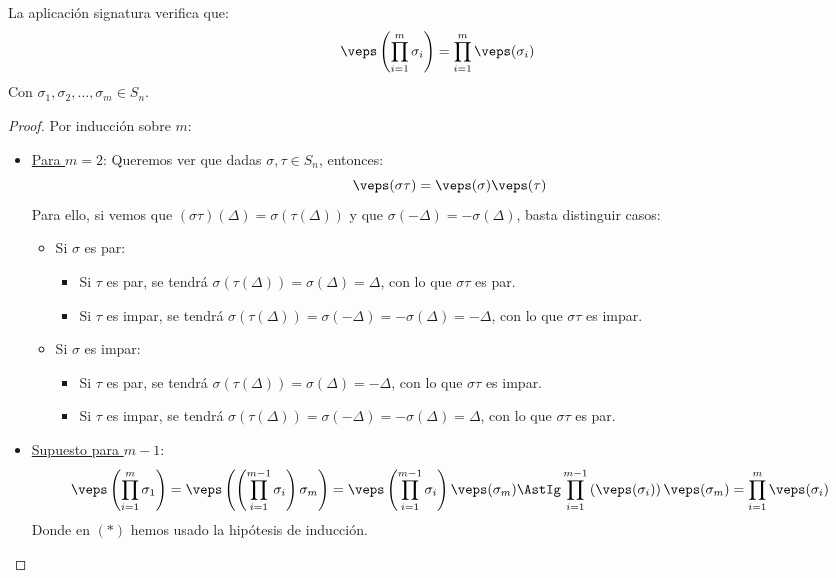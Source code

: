 \begin{prop}\label{prop:producto_signaturas}
    La aplicación signatura verifica que:
    \begin{equation*}
        \veps\left(\prod_{i=1}^{m}\sigma_i\right) = \prod_{i=1}^{m} \veps(\sigma_i)
    \end{equation*}
    Con $\sigma_1,\sigma_2,\ldots,\sigma_m\in S_n$.
    \begin{proof}
        Por inducción sobre $m$:
        \begin{itemize}
            \item \underline{Para $m=2$}: Queremos ver que dadas $\sigma,\tau\in S_n$, entonces:
                \begin{equation*}
                    \veps(\sigma\tau) = \veps(\sigma)\veps(\tau)
                \end{equation*}
                Para ello, si vemos que $(\sigma\tau)(\Delta) = \sigma(\tau(\Delta))$ y que $\sigma(-\Delta) = -\sigma(\Delta)$,
            basta distinguir casos:
            \begin{itemize}
                \item Si $\sigma$ es par:
                    \begin{itemize}
                        \item Si $\tau$ es par, se tendrá $\sigma(\tau(\Delta)) = \sigma(\Delta)=\Delta$, con lo que $\sigma\tau$ es par.
                        \item Si $\tau$ es impar, se tendrá $\sigma(\tau(\Delta)) = \sigma(-\Delta)=-\sigma(\Delta)=-\Delta$, con lo que $\sigma\tau$ es impar.
                    \end{itemize}
                \item Si $\sigma$ es impar:
                    \begin{itemize}
                        \item Si $\tau$ es par, se tendrá $\sigma(\tau(\Delta)) = \sigma(\Delta) = -\Delta$, con lo que $\sigma\tau$ es impar.
                        \item Si $\tau$ es impar, se tendrá $\sigma(\tau(\Delta)) = \sigma(-\Delta)=-\sigma(\Delta)=\Delta$, con lo que $\sigma\tau$ es par.
                    \end{itemize}
            \end{itemize}
            \item \underline{Supuesto para $m-1$}:
                \begin{equation*}
                    \veps\left(\prod_{i=1}^{m}\sigma_1\right) = \veps\left(\left(\prod_{i=1}^{m-1}\sigma_i\right)\sigma_m\right) = \veps\left(\prod_{i=1}^{m-1}\sigma_i\right)\veps(\sigma_m) \AstIg \prod_{i=1}^{m-1}\left(\veps(\sigma_i)\right)\veps(\sigma_m) = \prod_{i=1}^{m}\veps(\sigma_i)
                \end{equation*}
                Donde en $(\ast)$ hemos usado la hipótesis de inducción.
        \end{itemize}
    \end{proof}
\end{prop}

